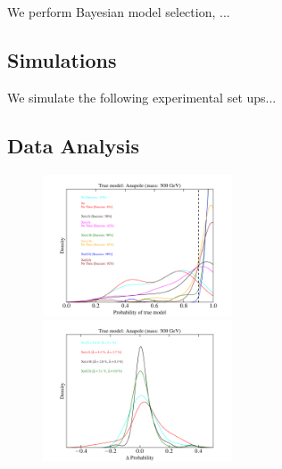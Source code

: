 \documentclass[11pt]{article}
\begin{document}
We perform Bayesian model selection, ...

\subsection{Simulations}

We simulate the following experimental set ups...

\subsection{Data Analysis}

\begin{figure}
\includegraphics[width=0.5\textwidth]{plots/PDF_500GeV_Anapole_50sims_Xe_Xe3x_Xe10x_XeG3_TNT_noGF.pdf}
\includegraphics[width=0.5\textwidth]{plots/PDF_500GeV_Anapole_50sims_Xe_Xe3x_Xe10x_XeG3_noGF_TimeDIFF.pdf}
\caption{\label{fig:500gev_anapole_XeFull_tnt_noGF}}
\end{figure}
\end{document}
